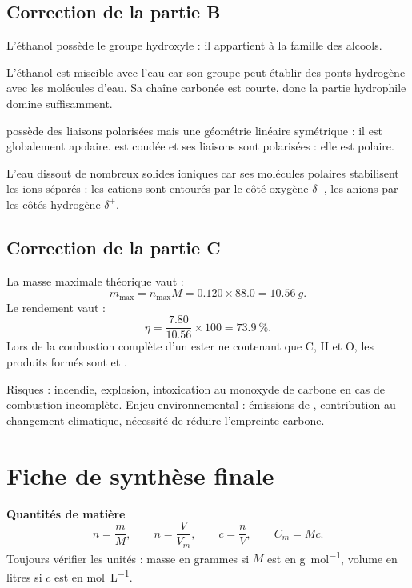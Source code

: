 \documentclass[11pt,a4paper]{article}
\begin{document}
\subsection*{Correction de la partie B}
\begin{correctionbox}
L'éthanol possède le groupe hydroxyle  : il appartient à la famille des alcools.

L'éthanol est miscible avec l'eau car son groupe  peut établir des ponts hydrogène avec les molécules d'eau. Sa chaîne carbonée est courte, donc la partie hydrophile domine suffisamment.

 possède des liaisons polarisées mais une géométrie linéaire symétrique : il est globalement apolaire.  est coudée et ses liaisons  sont polarisées : elle est polaire.

L'eau dissout de nombreux solides ioniques car ses molécules polaires stabilisent les ions séparés : les cations sont entourés par le côté oxygène $\delta^-$, les anions par les côtés hydrogène $\delta^+$.
\end{correctionbox}

\subsection*{Correction de la partie C}
\begin{correctionbox}
La masse maximale théorique vaut :
\[
m_{\max}=n_{\max}M=0.120\times88.0=\SI{10.56}{g}.
\]
Le rendement vaut :
\[
\eta=\frac{7.80}{10.56}\times100=\SI{73.9}{\percent}.
\]
Lors de la combustion complète d'un ester ne contenant que C, H et O, les produits formés sont  et .

Risques : incendie, explosion, intoxication au monoxyde de carbone en cas de combustion incomplète. Enjeu environnemental : émissions de , contribution au changement climatique, nécessité de réduire l'empreinte carbone.
\end{correctionbox}

\newpage

\section{Fiche de synthèse finale}

\begin{retenirbox}
\textbf{Quantités de matière}
\[
n=\frac{m}{M},\qquad n=\frac{V}{V_m},\qquad c=\frac{n}{V},\qquad C_m=Mc.
\]
Toujours vérifier les unités : masse en grammes si $M$ est en \si{g.mol^{-1}}, volume en litres si $c$ est en \si{mol.L^{-1}}.
\end{retenirbox}
\end{document}
